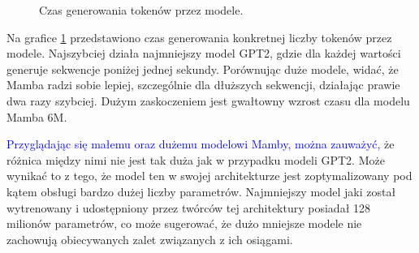 \documentclass[data-science]{agh-wi} %
\begin{document}
\begin{figure}
    \centering
    \caption{Czas generowania tokenów przez modele.}\label{fig:time_generate}
\end{figure}

Na grafice \ref*{fig:time_generate} przedstawiono czas generowania konkretnej liczby tokenów przez modele. Najszybciej działa najmniejszy model GPT2, gdzie dla każdej wartości generuje sekwencje poniżej jednej sekundy. Porównując duże modele, widać, że Mamba radzi sobie lepiej, szczególnie dla dłuższych sekwencji, działając prawie dwa razy szybciej. Dużym zaskoczeniem jest gwałtowny wzrost czasu dla modelu Mamba 6M.

\textcolor{blue}{Przyglądając się małemu oraz dużemu modelowi Mamby, można zauważyć, }że różnica między nimi nie jest tak duża jak w przypadku modeli GPT2. Może wynikać to z tego, że model ten w swojej architekturze jest zoptymalizowany pod kątem obsługi bardzo dużej liczby parametrów. Najmniejszy model jaki został wytrenowany i udostępniony przez twórców tej architektury posiadał 128 milionów parametrów, co może sugerować, że dużo mniejsze modele nie zachowują obiecywanych zalet związanych z ich osiągami.
\end{document}
